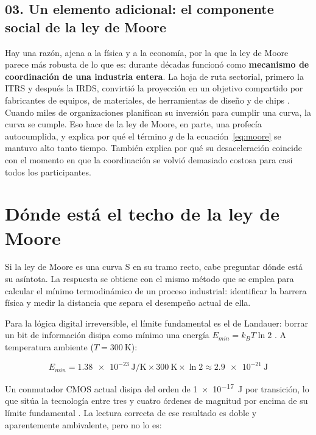 \documentclass[11pt,letterpaper]{article}
\begin{document}
\subsection*{03. Un elemento adicional: el componente social de la ley de Moore}

Hay una razón, ajena a la física y a la economía, por la que la ley de Moore
parece más robusta de lo que es: durante décadas funcionó como \textbf{mecanismo
de coordinación de una industria entera}. La hoja de ruta sectorial, primero la
ITRS y después la IRDS, convirtió la proyección en un objetivo compartido por
fabricantes de equipos, de materiales, de herramientas de diseño y de chips
\parencite{mack2011,irds2022}. Cuando miles de organizaciones planifican su
inversión para cumplir una curva, la curva se cumple. Eso hace de la ley de
Moore, en parte, una profecía autocumplida, y explica por qué el término $g$ de
la ecuación~\eqref{eq:moore} se mantuvo alto tanto tiempo. También explica por
qué su desaceleración coincide con el momento en que la coordinación se volvió
demasiado costosa para casi todos los participantes.

\section{Dónde está el techo de la ley de Moore}

Si la ley de Moore es una curva S en su tramo recto, cabe preguntar dónde está su
asíntota. La respuesta se obtiene con el mismo método que se emplea para calcular
el mínimo termodinámico de un proceso industrial: identificar la barrera física y
medir la distancia que separa el desempeño actual de ella.

Para la lógica digital irreversible, el límite fundamental es el de Landauer:
borrar un bit de información disipa como mínimo una energía
$E_{min} = k_B T \ln 2$ \parencite{landauer1961}. A temperatura ambiente
($T = \SI{300}{\kelvin}$):

\begin{equation}
  E_{min} = \SI{1.38e-23}{\joule\per\kelvin} \times \SI{300}{\kelvin}
  \times \ln 2 \approx \SI{2.9e-21}{\joule}
  \label{eq:landauer}
\end{equation}

Un conmutador CMOS actual disipa del orden de \SI{1e-17}{\joule} por transición,
lo que sitúa la tecnología entre tres y cuatro órdenes de magnitud por encima de
su límite fundamental \parencite{zhirnov2003}. La lectura correcta de ese
resultado es doble y aparentemente ambivalente, pero no lo es:
\end{document}
